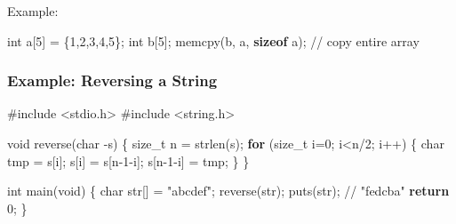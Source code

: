 \documentclass[
  letterpaper,
  DIV=11,
  numbers=noendperiod]{scrreprt}
\newenvironment{Shaded}{\begin{snugshade}}{\end{snugshade}}
\newcommand{\CommentTok}[1]{\textcolor[rgb]{0.37,0.37,0.37}{#1}}
\newcommand{\ControlFlowTok}[1]{\textcolor[rgb]{0.00,0.23,0.31}{\textbf{#1}}}
\newcommand{\DataTypeTok}[1]{\textcolor[rgb]{0.68,0.00,0.00}{#1}}
\newcommand{\DecValTok}[1]{\textcolor[rgb]{0.68,0.00,0.00}{#1}}
\newcommand{\ImportTok}[1]{\textcolor[rgb]{0.00,0.46,0.62}{#1}}
\newcommand{\KeywordTok}[1]{\textcolor[rgb]{0.00,0.23,0.31}{\textbf{#1}}}
\newcommand{\NormalTok}[1]{\textcolor[rgb]{0.00,0.23,0.31}{#1}}
\newcommand{\OperatorTok}[1]{\textcolor[rgb]{0.37,0.37,0.37}{#1}}
\newcommand{\PreprocessorTok}[1]{\textcolor[rgb]{0.68,0.00,0.00}{#1}}
\newcommand{\StringTok}[1]{\textcolor[rgb]{0.13,0.47,0.30}{#1}}
\begin{document}
Example:

\begin{Shaded}
\begin{Highlighting}[]
\DataTypeTok{int}\NormalTok{ a}\OperatorTok{[}\DecValTok{5}\OperatorTok{]} \OperatorTok{=} \OperatorTok{\{}\DecValTok{1}\OperatorTok{,}\DecValTok{2}\OperatorTok{,}\DecValTok{3}\OperatorTok{,}\DecValTok{4}\OperatorTok{,}\DecValTok{5}\OperatorTok{\};}
\DataTypeTok{int}\NormalTok{ b}\OperatorTok{[}\DecValTok{5}\OperatorTok{];}
\NormalTok{memcpy}\OperatorTok{(}\NormalTok{b}\OperatorTok{,}\NormalTok{ a}\OperatorTok{,} \KeywordTok{sizeof}\NormalTok{ a}\OperatorTok{);}  \CommentTok{// copy entire array}
\end{Highlighting}
\end{Shaded}

\subsubsection{Example: Reversing a
String}\label{example-reversing-a-string}

\begin{Shaded}
\begin{Highlighting}[]
\PreprocessorTok{\#include }\ImportTok{\textless{}stdio.h\textgreater{}}
\PreprocessorTok{\#include }\ImportTok{\textless{}string.h\textgreater{}}

\DataTypeTok{void}\NormalTok{ reverse}\OperatorTok{(}\DataTypeTok{char} \OperatorTok{{-}}\NormalTok{s}\OperatorTok{)} \OperatorTok{\{}
    \DataTypeTok{size\_t}\NormalTok{ n }\OperatorTok{=}\NormalTok{ strlen}\OperatorTok{(}\NormalTok{s}\OperatorTok{);}
    \ControlFlowTok{for} \OperatorTok{(}\DataTypeTok{size\_t}\NormalTok{ i}\OperatorTok{=}\DecValTok{0}\OperatorTok{;}\NormalTok{ i}\OperatorTok{\textless{}}\NormalTok{n}\OperatorTok{/}\DecValTok{2}\OperatorTok{;}\NormalTok{ i}\OperatorTok{++)} \OperatorTok{\{}
        \DataTypeTok{char}\NormalTok{ tmp }\OperatorTok{=}\NormalTok{ s}\OperatorTok{[}\NormalTok{i}\OperatorTok{];}
\NormalTok{        s}\OperatorTok{[}\NormalTok{i}\OperatorTok{]} \OperatorTok{=}\NormalTok{ s}\OperatorTok{[}\NormalTok{n}\OperatorTok{{-}}\DecValTok{1}\OperatorTok{{-}}\NormalTok{i}\OperatorTok{];}
\NormalTok{        s}\OperatorTok{[}\NormalTok{n}\OperatorTok{{-}}\DecValTok{1}\OperatorTok{{-}}\NormalTok{i}\OperatorTok{]} \OperatorTok{=}\NormalTok{ tmp}\OperatorTok{;}
    \OperatorTok{\}}
\OperatorTok{\}}

\DataTypeTok{int}\NormalTok{ main}\OperatorTok{(}\DataTypeTok{void}\OperatorTok{)} \OperatorTok{\{}
    \DataTypeTok{char}\NormalTok{ str}\OperatorTok{[]} \OperatorTok{=} \StringTok{"abcdef"}\OperatorTok{;}
\NormalTok{    reverse}\OperatorTok{(}\NormalTok{str}\OperatorTok{);}
\NormalTok{    puts}\OperatorTok{(}\NormalTok{str}\OperatorTok{);}  \CommentTok{// "fedcba"}
    \ControlFlowTok{return} \DecValTok{0}\OperatorTok{;}
\OperatorTok{\}}
\end{Highlighting}
\end{Shaded}
\end{document}
